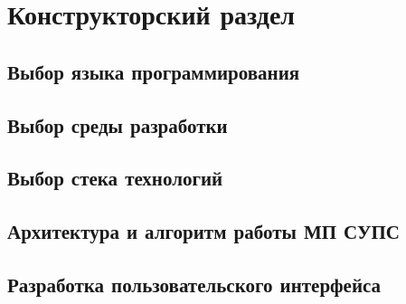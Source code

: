 \chapter{Конструкторский раздел}
\label{ch:design}

\section{Выбор языка программирования}
\label{sec:language}

\section{Выбор среды разработки}
\label{sec:ide}

\section{Выбор стека технологий}
\label{sec:stack}

\section{Архитектура и алгоритм работы МП СУПС}
\label{sec:architecture}

\section{Разработка пользовательского интерфейса}
\label{sec:gui}

\conclusions
\label{sec:designConclusions}
